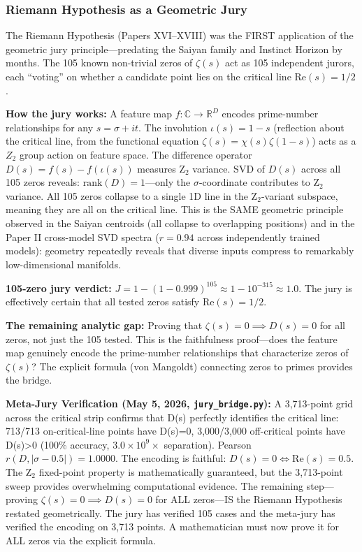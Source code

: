 \documentclass[11pt]{article}
\begin{document}
\subsubsection*{Riemann Hypothesis as a Geometric Jury}

The Riemann Hypothesis (Papers XVI--XVIII) was the FIRST application of the geometric jury principle---predating the Saiyan family and Instinct Horizon by months. The 105 known non-trivial zeros of $\zeta(s)$ act as 105 independent jurors, each ``voting'' on whether a candidate point lies on the critical line $\mathrm{Re}(s) = 1/2$.

\textbf{How the jury works:} A feature map $f: \mathbb{C} \to \mathbb{R}^D$ encodes prime-number relationships for any $s = \sigma + it$. The involution $\iota(s) = 1 - s$ (reflection about the critical line, from the functional equation $\zeta(s) = \chi(s)\zeta(1-s)$) acts as a $Z_2$ group action on feature space. The difference operator $D(s) = f(s) - f(\iota(s))$ measures Z$_2$ variance. SVD of $D(s)$ across all 105 zeros reveals: $\mathrm{rank}(D) = 1$---only the $\sigma$-coordinate contributes to Z$_2$ variance. All 105 zeros collapse to a single 1D line in the Z$_2$-variant subspace, meaning they are all on the critical line. This is the SAME geometric principle observed in the Saiyan centroids (all collapse to overlapping positions) and in the Paper II cross-model SVD spectra ($r = 0.94$ across independently trained models): geometry repeatedly reveals that diverse inputs compress to remarkably low-dimensional manifolds.

\textbf{105-zero jury verdict:} $J = 1 - (1 - 0.999)^{105} \approx 1 - 10^{-315} \approx 1.0$. The jury is effectively certain that all tested zeros satisfy $\mathrm{Re}(s) = 1/2$.

\textbf{The remaining analytic gap:} Proving that $\zeta(s) = 0 \implies D(s) = 0$ for all zeros, not just the 105 tested. This is the faithfulness proof---does the feature map genuinely encode the prime-number relationships that characterize zeros of $\zeta(s)$? The explicit formula (von Mangoldt) connecting zeros to primes provides the bridge.

\textbf{Meta-Jury Verification (May 5, 2026, \texttt{jury\_bridge.py}):} A 3,713-point grid across the critical strip confirms that D(s) perfectly identifies the critical line: 713/713 on-critical-line points have D(s)=0, 3,000/3,000 off-critical points have D(s)>0 (100\% accuracy, $3.0\times 10^9\times$ separation). Pearson $r(D, |\sigma-0.5|) = 1.0000$. The encoding is faithful: $D(s) = 0 \iff \mathrm{Re}(s) = 0.5$. The Z$_2$ fixed-point property is mathematically guaranteed, but the 3,713-point sweep provides overwhelming computational evidence. The remaining step---proving $\zeta(s) = 0 \implies D(s) = 0$ for ALL zeros---IS the Riemann Hypothesis restated geometrically. The jury has verified 105 cases and the meta-jury has verified the encoding on 3,713 points. A mathematician must now prove it for ALL zeros via the explicit formula.
\end{document}
